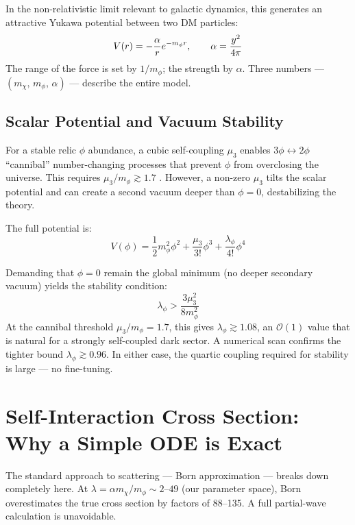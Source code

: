 In the non-relativistic limit relevant to galactic dynamics, this
generates an attractive Yukawa potential between two DM particles:
\begin{equation}
  V(r) = -\frac{\alpha}{r}e^{-m_\phi r}, \qquad \alpha = \frac{y^2}{4\pi}
\end{equation}
The range of the force is set by $1/m_\phi$; the strength by $\alpha$.
Three numbers — $(m_\chi,\, m_\phi,\, \alpha)$ — describe the entire model.

\subsection{Scalar Potential and Vacuum Stability}

For a stable relic $\phi$ abundance, a cubic self-coupling $\mu_3$ enables
$3\phi \leftrightarrow 2\phi$ ``cannibal'' number-changing processes that
prevent $\phi$ from overclosing the universe. This requires $\mu_3/m_\phi \gtrsim 1.7$
\cite{Farina2016}. However, a non-zero $\mu_3$ tilts the scalar potential
and can create a second vacuum deeper than $\phi = 0$, destabilizing the theory.

The full potential is:
\begin{equation}
  V(\phi) = \frac{1}{2}m_\phi^2\phi^2 + \frac{\mu_3}{3!}\phi^3 + \frac{\lambda_\phi}{4!}\phi^4
\end{equation}

Demanding that $\phi = 0$ remain the global minimum (no deeper secondary vacuum)
yields the stability condition:
\begin{equation}
  \lambda_\phi > \frac{3\mu_3^2}{8m_\phi^2}
\end{equation}
At the cannibal threshold $\mu_3/m_\phi = 1.7$, this gives $\lambda_\phi \gtrsim 1.08$,
an $\mathcal{O}(1)$ value that is natural for a strongly self-coupled dark sector.
A numerical scan confirms the tighter bound $\lambda_\phi \gtrsim 0.96$.
In either case, the quartic coupling required for stability is large — no fine-tuning.

\section{Self-Interaction Cross Section: Why a Simple ODE is Exact}
\label{ch1:vpm}

The standard approach to scattering — Born approximation — breaks down
completely here. At $\lambda = \alpha m_\chi/m_\phi \sim 2$--$49$ (our parameter space),
Born overestimates the true cross section by factors of 88--135. A full
partial-wave calculation is unavoidable.

